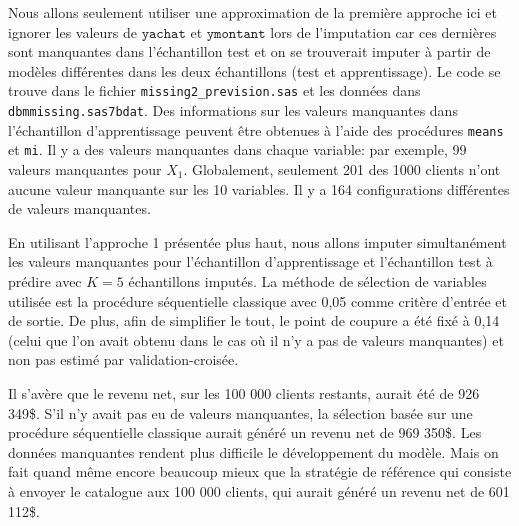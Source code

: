 \documentclass[
  11pt,
  letterpaper,
]{book}
\theoremstyle{definition}
\theoremstyle{definition}
\theoremstyle{definition}
\theoremstyle{remark}
\begin{document}
Nous allons seulement utiliser une approximation de la première approche ici et ignorer les valeurs de \(\texttt{yachat}\) et \(\texttt{ymontant}\) lors de l'imputation car ces dernières sont manquantes dans l'échantillon test et on se trouverait imputer à partir de modèles différentes dans les deux échantillons (test et apprentissage). Le code se trouve dans le fichier \texttt{missing2\_prevision.sas} et les données dans \texttt{dbmmissing.sas7bdat}. Des informations sur les valeurs manquantes dans l'échantillon d'apprentissage peuvent être obtenues à l'aide des procédures \texttt{means} et \texttt{mi}. Il y a des valeurs manquantes dans chaque variable: par exemple, 99 valeurs manquantes pour \(X_1\). Globalement, seulement 201 des 1000 clients n'ont aucune valeur manquante sur les 10 variables. Il y a 164 configurations différentes de valeurs manquantes.

En utilisant l'approche 1 présentée plus haut, nous allons imputer simultanément les valeurs manquantes pour l'échantillon d'apprentissage et l'échantillon test à prédire avec \(K=5\) échantillons imputés. La méthode de sélection de variables utilisée est la procédure séquentielle classique avec 0,05 comme critère d'entrée et de sortie. De plus, afin de simplifier le tout, le point de coupure a été fixé à 0,14 (celui que l'on avait obtenu dans le cas où il n'y a pas de valeurs manquantes) et non pas estimé par validation-croisée.

Il s'avère que le revenu net, sur les 100 000 clients restants, aurait été de 926 349\$. S'il n'y avait pas eu de valeurs manquantes, la sélection basée sur une procédure séquentielle classique aurait généré un revenu net de 969 350\$. Les données manquantes rendent plus difficile le développement du modèle. Mais on fait quand même encore beaucoup mieux que la stratégie de référence qui consiste à envoyer le catalogue aux 100 000 clients, qui aurait généré un revenu net de 601 112\$.

  
\end{document}
